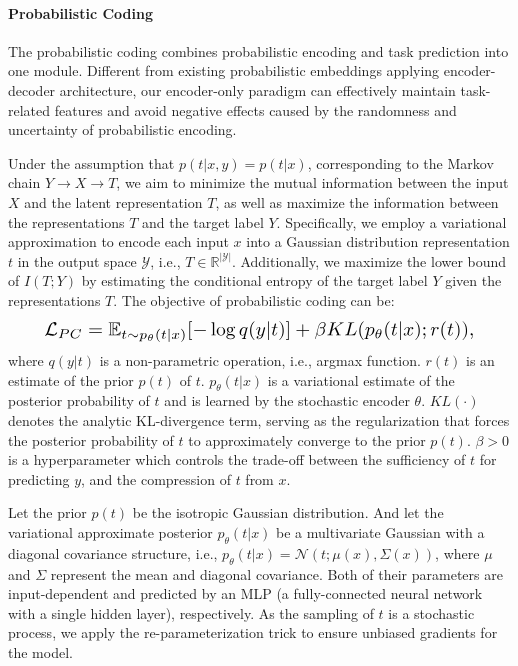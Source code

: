 \documentclass[letterpaper]{article} %
\begin{document}
\paragraph{Probabilistic Coding}
The probabilistic coding combines probabilistic encoding and task prediction into one module. Different from existing probabilistic embeddings applying encoder-decoder architecture, our encoder-only paradigm can effectively maintain task-related features and avoid negative effects caused by the randomness and uncertainty of probabilistic encoding.


Under the assumption that $p(t|x,y)=p(t|x)$, corresponding to the Markov chain $Y \rightarrow X \rightarrow T$,
we aim to minimize the mutual information between the input $X$ and the latent representation $T$, as well as maximize the information between the representations $T$ and the target label $Y$.
Specifically, we employ a variational approximation to encode each input $x$ into a Gaussian distribution representation $t$ in the output space $\mathcal{Y}$, i.e., $T \in \mathbb{R}^{|\mathcal{Y}|}$.
Additionally, we maximize the lower bound of $I(T;Y)$
by estimating the conditional entropy of the target label $Y$ given the representations $T$.
The objective of probabilistic coding can be:
\begin{equation}
\resizebox{0.89\linewidth}{!}{$
\begin{split}
      \mathcal{L}_{PC} = \mathbb{E}_{t \sim p_{\theta}(t|x)} [-\log q(y|t)]
     + \beta  KL(p_{\theta}(t|x); r(t)),
\end{split}
$}
\end{equation}
where $q(y|t)$ is a non-parametric operation, i.e., argmax function.
$r(t)$ is an estimate of the prior $p(t)$ of $t$.
$p_{\theta}(t|x)$
is a variational estimate of the posterior probability of $t$ and is learned by the stochastic encoder $\theta$.
$KL(\cdot)$ denotes the analytic KL-divergence term, serving as the regularization that forces the posterior probability of $t$ to approximately converge to the prior $p(t)$.
$\beta > 0$ is a hyperparameter which controls the trade-off between the sufficiency of $t$ for predicting $y$, and the compression of $t$ from $x$.

Let the prior $p(t)$ be the isotropic Gaussian distribution.
And let the variational approximate posterior $p_{\theta}(t|x)$ be
a multivariate Gaussian with a diagonal covariance structure,
i.e., $p_{\theta}(t|x) = \mathcal{N}(t;{\mu}(x), \Sigma(x))$, where $\mu$ and $\Sigma$ represent the mean and diagonal covariance.
Both of their parameters are input-dependent and predicted by an MLP (a fully-connected neural network with a single hidden layer), respectively.
As the sampling of $t$ is a stochastic process, we apply the re-parameterization trick \cite{DBLP:journals/corr/KingmaW13} to ensure unbiased gradients for the model.
\end{document}
